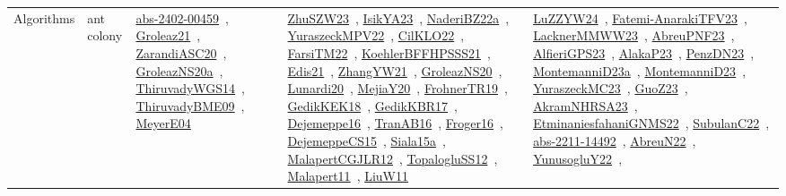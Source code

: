 {\begin{longtable}{lp{3cm}>{\raggedright\arraybackslash}p{6cm}>{\raggedright\arraybackslash}p{6cm}>{\raggedright\arraybackslash}p{8cm}}
\index{ant colony}\index{Algorithms!ant colony}Algorithms & ant colony & \href{../works/abs-2402-00459.pdf}{abs-2402-00459}~\cite{abs-2402-00459}, \href{../works/Groleaz21.pdf}{Groleaz21}~\cite{Groleaz21}, \href{../works/ZarandiASC20.pdf}{ZarandiASC20}~\cite{ZarandiASC20}, \href{../works/GroleazNS20a.pdf}{GroleazNS20a}~\cite{GroleazNS20a}, \href{../works/ThiruvadyWGS14.pdf}{ThiruvadyWGS14}~\cite{ThiruvadyWGS14}, \href{../works/ThiruvadyBME09.pdf}{ThiruvadyBME09}~\cite{ThiruvadyBME09}, \href{../works/MeyerE04.pdf}{MeyerE04}~\cite{MeyerE04} & \href{../works/ZhuSZW23.pdf}{ZhuSZW23}~\cite{ZhuSZW23}, \href{../works/IsikYA23.pdf}{IsikYA23}~\cite{IsikYA23}, \href{../works/NaderiBZ22a.pdf}{NaderiBZ22a}~\cite{NaderiBZ22a}, \href{../works/YuraszeckMPV22.pdf}{YuraszeckMPV22}~\cite{YuraszeckMPV22}, \href{../works/CilKLO22.pdf}{CilKLO22}~\cite{CilKLO22}, \href{../works/FarsiTM22.pdf}{FarsiTM22}~\cite{FarsiTM22}, \href{../works/KoehlerBFFHPSSS21.pdf}{KoehlerBFFHPSSS21}~\cite{KoehlerBFFHPSSS21}, \href{../works/Edis21.pdf}{Edis21}~\cite{Edis21}, \href{../works/ZhangYW21.pdf}{ZhangYW21}~\cite{ZhangYW21}, \href{../works/GroleazNS20.pdf}{GroleazNS20}~\cite{GroleazNS20}, \href{../works/Lunardi20.pdf}{Lunardi20}~\cite{Lunardi20}, \href{../works/MejiaY20.pdf}{MejiaY20}~\cite{MejiaY20}, \href{../works/FrohnerTR19.pdf}{FrohnerTR19}~\cite{FrohnerTR19}, \href{../works/GedikKEK18.pdf}{GedikKEK18}~\cite{GedikKEK18}, \href{../works/GedikKBR17.pdf}{GedikKBR17}~\cite{GedikKBR17}, \href{../works/Dejemeppe16.pdf}{Dejemeppe16}~\cite{Dejemeppe16}, \href{../works/TranAB16.pdf}{TranAB16}~\cite{TranAB16}, \href{../works/Froger16.pdf}{Froger16}~\cite{Froger16}, \href{../works/DejemeppeCS15.pdf}{DejemeppeCS15}~\cite{DejemeppeCS15}, \href{../works/Siala15a.pdf}{Siala15a}~\cite{Siala15a}, \href{../works/MalapertCGJLR12.pdf}{MalapertCGJLR12}~\cite{MalapertCGJLR12}, \href{../works/TopalogluSS12.pdf}{TopalogluSS12}~\cite{TopalogluSS12}, \href{../works/Malapert11.pdf}{Malapert11}~\cite{Malapert11}, \href{../works/LiuW11.pdf}{LiuW11}~\cite{LiuW11} & \href{../works/LuZZYW24.pdf}{LuZZYW24}~\cite{LuZZYW24}, \href{../works/Fatemi-AnarakiTFV23.pdf}{Fatemi-AnarakiTFV23}~\cite{Fatemi-AnarakiTFV23}, \href{../works/LacknerMMWW23.pdf}{LacknerMMWW23}~\cite{LacknerMMWW23}, \href{../works/AbreuPNF23.pdf}{AbreuPNF23}~\cite{AbreuPNF23}, \href{../works/AlfieriGPS23.pdf}{AlfieriGPS23}~\cite{AlfieriGPS23}, \href{../works/AlakaP23.pdf}{AlakaP23}~\cite{AlakaP23}, \href{../works/PenzDN23.pdf}{PenzDN23}~\cite{PenzDN23}, \href{../works/MontemanniD23a.pdf}{MontemanniD23a}~\cite{MontemanniD23a}, \href{../works/MontemanniD23.pdf}{MontemanniD23}~\cite{MontemanniD23}, \href{../works/YuraszeckMC23.pdf}{YuraszeckMC23}~\cite{YuraszeckMC23}, \href{../works/GuoZ23.pdf}{GuoZ23}~\cite{GuoZ23}, \href{../works/AkramNHRSA23.pdf}{AkramNHRSA23}~\cite{AkramNHRSA23}, \href{../works/EtminaniesfahaniGNMS22.pdf}{EtminaniesfahaniGNMS22}~\cite{EtminaniesfahaniGNMS22}, \href{../works/SubulanC22.pdf}{SubulanC22}~\cite{SubulanC22}, \href{../works/abs-2211-14492.pdf}{abs-2211-14492}~\cite{abs-2211-14492}, \href{../works/AbreuN22.pdf}{AbreuN22}~\cite{AbreuN22}, \href{../works/YunusogluY22.pdf}{YunusogluY22}~\cite{YunusogluY22}, 
\end{longtable}}
